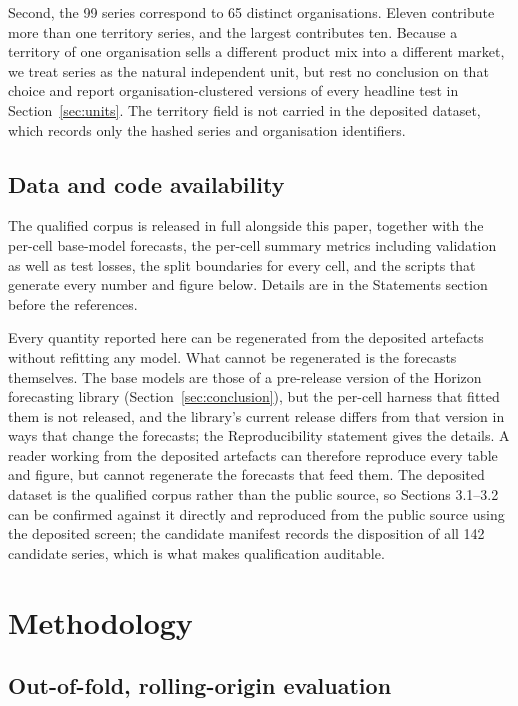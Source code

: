 \documentclass[11pt]{article}
\begin{document}
Second, the 99 series correspond to 65 distinct organisations. Eleven contribute more than one territory series, and the largest contributes ten. Because a territory of one organisation sells a different product mix into a different market, we treat series as the natural independent unit, but rest no conclusion on that choice and report organisation-clustered versions of every headline test in Section~\ref{sec:units}. The territory field is not carried in the deposited dataset, which records only the hashed series and organisation identifiers.

\subsection{Data and code availability}

The qualified corpus is released in full alongside this paper, together with the per-cell base-model forecasts, the per-cell summary metrics including validation as well as test losses, the split boundaries for every cell, and the scripts that generate every number and figure below. Details are in the Statements section before the references.

Every quantity reported here can be regenerated from the deposited artefacts without refitting any model. What cannot be regenerated is the forecasts themselves. The base models are those of a pre-release version of the Horizon forecasting library (Section~\ref{sec:conclusion}), but the per-cell harness that fitted them is not released, and the library's current release differs from that version in ways that change the forecasts; the Reproducibility statement gives the details. A reader working from the deposited artefacts can therefore reproduce every table and figure, but cannot regenerate the forecasts that feed them. The deposited dataset is the qualified corpus rather than the public source, so Sections 3.1--3.2 can be confirmed against it directly and reproduced from the public source using the deposited screen; the candidate manifest records the disposition of all 142 candidate series, which is what makes qualification auditable.

\section{Methodology}

\subsection{Out-of-fold, rolling-origin evaluation}
\label{sec:design}
\end{document}
